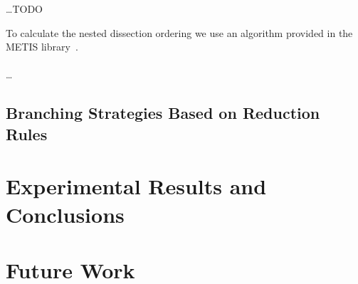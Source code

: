 \documentclass[]{article}
\begin{document}
\dots TODO

To calculate the nested dissection ordering we use an algorithm provided in the METIS library~\cite{bibid}.
\paragraph{} \dots


\subsection{Branching Strategies Based on Reduction Rules} \label{red_strats}

\newpage
\section{Experimental Results and Conclusions} \label{sec5}
\section{Future Work} \label{sec6}
\newpage




\end{document}
